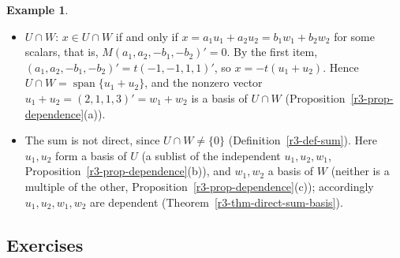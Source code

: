 \documentclass[12pt]{article}
\newcommand{\R}{\mathbb R}
\DeclareMathOperator{\Span}{span}
\theoremstyle{definition}
\newtheorem{example}[theorem]{Example}
\begin{document}
\begin{example}
\begin{itemize}
operations take \([u_1\ u_2\ w_1]\) to the first three columns of \(R\) (row operations act on each
column separately, Theorems~\ref{r2-thm-elementary}(c) and~\ref{r1-thm-views}(a)), which are \(e_1,e_2,e_3\in\R^4\); every column is a pivot column, so
\(u_1,u_2,w_1\) are independent (Proposition~\ref{r3-prop-independence-test}) and form a basis of
\(U+W\).
\item \(U\cap W\): \(x\in U\cap W\) if and only if \(x=a_1u_1+a_2u_2=b_1w_1+b_2w_2\) for some
scalars, that is, \(M(a_1,a_2,-b_1,-b_2)'=0\). By the first item,
\((a_1,a_2,-b_1,-b_2)'=t(-1,-1,1,1)'\), so \(x=-t(u_1+u_2)\). Hence \(U\cap W=\Span\{u_1+u_2\}\), and the
nonzero vector \(u_1+u_2=(2,1,1,3)'=w_1+w_2\) is a basis of \(U\cap W\)
(Proposition~\ref{r3-prop-dependence}(a)).
\item The sum is not direct, since \(U\cap W\ne\{0\}\) (Definition~\ref{r3-def-sum}). Here \(u_1,u_2\) form a
basis of \(U\) (a sublist of the independent \(u_1,u_2,w_1\), Proposition~\ref{r3-prop-dependence}(b)), and
\(w_1,w_2\) a basis of \(W\) (neither is a multiple of the other, Proposition~\ref{r3-prop-dependence}(c));
accordingly \(u_1,u_2,w_1,w_2\) are dependent (Theorem~\ref{r3-thm-direct-sum-basis}).
\end{itemize}
\end{example}

\subsection*{Exercises}
\end{document}
